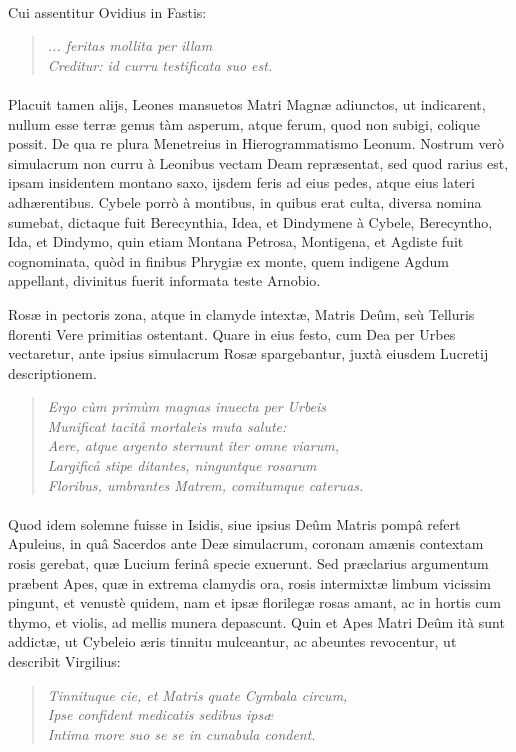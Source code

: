 \documentclass[a4paper, 11pt, oneside, polutonikogreek, latin]{article}
\begin{document}
\paragraph{}
Cui assentitur Ovidius in Fastis:
\begin{quote}
\emph{... feritas mollita per illam}\\
\emph{Creditur: id curru testificata suo est.}\\
\end{quote}
\paragraph{}
Placuit tamen alijs, Leones mansuetos Matri Magnæ adiunctos, ut indicarent, nullum esse terræ genus tàm asperum, atque ferum, quod non subigi, colique possit. De qua re plura Menetreius in Hierogrammatismo Leonum. Nostrum verò simulacrum non curru à Leonibus vectam Deam repræsentat, sed quod rarius est, ipsam insidentem montano saxo, ijsdem feris ad eius pedes, atque eius lateri adhærentibus. Cybele porrò à montibus, in quibus erat culta, diversa nomina sumebat, dictaque fuit Berecynthia, Idea, et Dindymene à Cybele, Berecyntho, Ida, et Dindymo, quin etiam Montana Petrosa, Montigena, et Agdiste fuit cognominata, quòd in finibus Phrygiæ ex monte, quem indigene Agdum appellant, divinitus fuerit informata teste Arnobio.

Rosæ in pectoris zona, atque in clamyde intextæ, Matris Deûm, seù Telluris florenti Vere primitias ostentant. Quare in eius festo, cum Dea per Urbes vectaretur, ante ipsius simulacrum Rosæ spargebantur, juxtà eiusdem Lucretij descriptionem.
\begin{quote}
\emph{Ergo cùm primùm magnas inuecta per Urbeis}\\
\emph{Munificat tacitå mortaleis muta salute:}\\
\emph{Aere, atque argento sternunt iter omne viarum,}\\
\emph{Largificå stipe ditantes, ninguntque rosarum}\\
\emph{Floribus, umbrantes Matrem, comitumque cateruas.}\\
\end{quote}
\paragraph{}
Quod idem solemne fuisse in Isidis, siue ipsius Deûm Matris pompâ refert Apuleius, in quâ Sacerdos ante Deæ simulacrum, coronam amænis contextam rosis gerebat, quæ Lucium ferinâ specie exuerunt. Sed præclarius argumentum præbent Apes, quæ in extrema clamydis ora, rosis intermixtæ limbum vicissim pingunt, et venustè quidem, nam et ipsæ florilegæ rosas amant, ac in hortis cum thymo, et violis, ad mellis munera depascunt. Quin et Apes Matri Deûm ità sunt addictæ, ut Cybeleio æris tinnitu mulceantur, ac abeuntes revocentur, ut describit Virgilius:
\begin{quote}
\emph{Tinnituque cie, et Matris quate Cymbala circum,}\\
\emph{Ipse confident medicatis sedibus ipsæ}\\
\emph{Intima more suo se se in cunabula condent.}\\
\end{quote}
\end{document}
